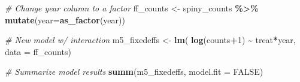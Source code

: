 \documentclass[
]{article}
\newenvironment{Shaded}{\begin{snugshade}}{\end{snugshade}}
\newcommand{\AttributeTok}[1]{\textcolor[rgb]{0.13,0.29,0.53}{#1}}
\newcommand{\CommentTok}[1]{\textcolor[rgb]{0.56,0.35,0.01}{\textit{#1}}}
\newcommand{\ConstantTok}[1]{\textcolor[rgb]{0.56,0.35,0.01}{#1}}
\newcommand{\DecValTok}[1]{\textcolor[rgb]{0.00,0.00,0.81}{#1}}
\newcommand{\FunctionTok}[1]{\textcolor[rgb]{0.13,0.29,0.53}{\textbf{#1}}}
\newcommand{\NormalTok}[1]{#1}
\newcommand{\OtherTok}[1]{\textcolor[rgb]{0.56,0.35,0.01}{#1}}
\newcommand{\SpecialCharTok}[1]{\textcolor[rgb]{0.81,0.36,0.00}{\textbf{#1}}}
\begin{document}
\begin{Shaded}
\begin{Highlighting}[]
\CommentTok{\# Change year column to a factor }
\NormalTok{ff\_counts }\OtherTok{\textless{}{-}}\NormalTok{ spiny\_counts }\SpecialCharTok{\%\textgreater{}\%} 
    \FunctionTok{mutate}\NormalTok{(}\AttributeTok{year=}\FunctionTok{as\_factor}\NormalTok{(year))}

\CommentTok{\# New model w/ interaction}
\NormalTok{m5\_fixedeffs }\OtherTok{\textless{}{-}} \FunctionTok{lm}\NormalTok{(}
    \FunctionTok{log}\NormalTok{(counts}\SpecialCharTok{+}\DecValTok{1}\NormalTok{) }\SpecialCharTok{\textasciitilde{}}\NormalTok{ treat}\SpecialCharTok{*}\NormalTok{year,}
    \AttributeTok{data =}\NormalTok{ ff\_counts)}

\CommentTok{\# Summarize model results }
\FunctionTok{summ}\NormalTok{(m5\_fixedeffs, }\AttributeTok{model.fit =} \ConstantTok{FALSE}\NormalTok{)}
\end{Highlighting}
\end{Shaded}
\end{document}
